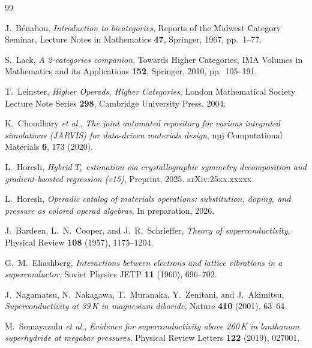 \documentclass[12pt,a4paper]{article}
\theoremstyle{plain}
\theoremstyle{definition}
\theoremstyle{remark}
\begin{document}
\begin{thebibliography}{99}

J.~B\'{e}nabou,
\emph{Introduction to bicategories},
Reports of the Midwest Category Seminar, Lecture Notes in Mathematics
\textbf{47}, Springer, 1967, pp.~1--77.

S.~Lack,
\emph{A 2-categories companion},
Towards Higher Categories, IMA Volumes in Mathematics and its Applications
\textbf{152}, Springer, 2010, pp.~105--191.

T.~Leinster,
\emph{Higher Operads, Higher Categories},
London Mathematical Society Lecture Note Series \textbf{298},
Cambridge University Press, 2004.

K.~Choudhary \textit{et al.},
\emph{The joint automated repository for various integrated simulations
(JARVIS) for data-driven materials design},
npj Computational Materials \textbf{6}, 173 (2020).

L.~Horesh,
\emph{Hybrid $T_c$ estimation via crystallographic symmetry decomposition
and gradient-boosted regression (v15)},
Preprint, 2025.
arXiv:25xx.xxxxx.

L.~Horesh,
\emph{Operadic catalog of materials operations: substitution, doping,
and pressure as colored operad algebras},
In preparation, 2026.

J.~Bardeen, L.~N.~Cooper, and J.~R.~Schrieffer,
\emph{Theory of superconductivity},
Physical Review \textbf{108} (1957), 1175--1204.

G.~M.~Eliashberg,
\emph{Interactions between electrons and lattice vibrations in a
superconductor},
Soviet Physics JETP \textbf{11} (1960), 696--702.

J.~Nagamatsu, N.~Nakagawa, T.~Muranaka, Y.~Zenitani, and J.~Akimitsu,
\emph{Superconductivity at 39\,K in magnesium diboride},
Nature \textbf{410} (2001), 63--64.

M.~Somayazulu \textit{et al.},
\emph{Evidence for superconductivity above 260\,K in lanthanum
superhydride at megabar pressures},
Physical Review Letters \textbf{122} (2019), 027001.

\end{thebibliography}
\end{document}
